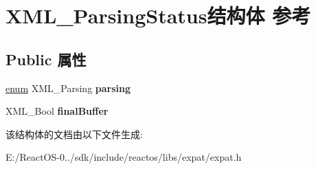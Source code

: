 \hypertarget{struct_x_m_l___parsing_status}{}\section{X\+M\+L\+\_\+\+Parsing\+Status结构体 参考}
\label{struct_x_m_l___parsing_status}
\subsection*{Public 属性}
\begin{DoxyCompactItemize}
\item 
\mbox{\label{struct_x_m_l___parsing_status_af7f58f4731cf34a10da39dd7b9cfb82b}} 
\hyperlink{interfaceenum}{enum} X\+M\+L\+\_\+\+Parsing {\bfseries parsing}
\item 
\mbox{\label{struct_x_m_l___parsing_status_ac9f1a8f3a0f2f0e886760756c0022880}} 
X\+M\+L\+\_\+\+Bool {\bfseries final\+Buffer}
\end{DoxyCompactItemize}


该结构体的文档由以下文件生成\+:\begin{DoxyCompactItemize}
\item 
E\+:/\+React\+O\+S-\/0../sdk/include/reactos/libs/expat/expat.\+h\end{DoxyCompactItemize}
